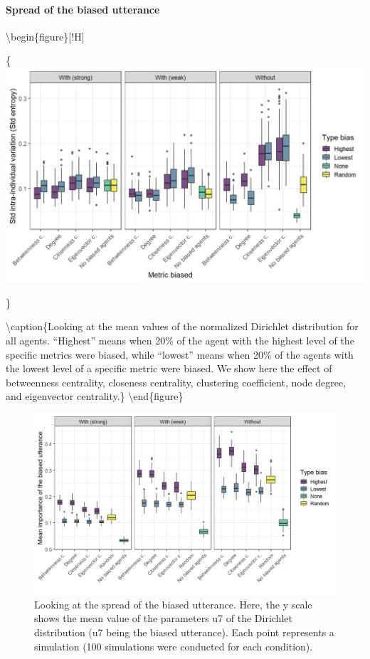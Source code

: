 \documentclass[
]{article}
\begin{document}
\hypertarget{spread-of-the-biased-utterance}{%
\paragraph{Spread of the biased
utterance}\label{spread-of-the-biased-utterance}}

\textbackslash begin\{figure\}{[}!H{]}

\{\centering \includegraphics{./Figures/unnamed-chunk-198-1}

\}

\textbackslash caption\{Looking at the mean values of the normalized
Dirichlet distribution for all agents. ``Highest'' means when 20\% of
the agent with the highest level of the specific metrics were biased,
while ``lowest'' means when 20\% of the agents with the lowest level of
a specific metric were biased. We show here the effect of betweenness
centrality, closeness centrality, clustering coefficient, node degree,
and eigenvector centrality.\}\label{fig:unnamed-chunk-198}
\textbackslash end\{figure\}

\begin{figure}[!H]

{\centering \includegraphics{./Figures/unnamed-chunk-199-1} 

}

\caption{Looking at the spread of the biased utterance. Here, the y scale shows the mean value of the parameters u7 of the Dirichlet distribution (u7 being the biased utterance). Each point represents a simulation (100 simulations were conducted for each condition). }\label{fig:unnamed-chunk-199}
\end{figure}
\end{document}
